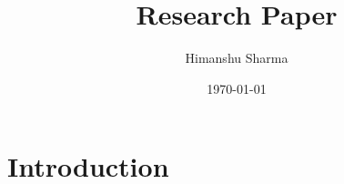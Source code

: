 \documentclass[12pt,twoside,openright]{report}
\title{Research Paper}
\author{Himanshu Sharma}
\date{\today}
\begin{document}

\maketitle
\pagebreak

\section{Introduction}









\end{document}
